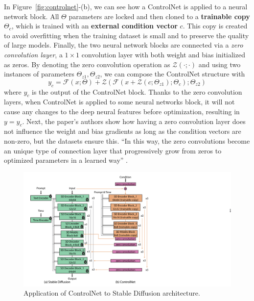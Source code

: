 \documentclass[preprint]{elsarticle}
\begin{document}
In Figure~\ref{fig:controlnet}-(b), we can see how a ControlNet is applied to a neural network block.
All $\Theta$ parameters are locked and then cloned to a \textbf{trainable copy} $\Theta_c$, 
which is trained with an \textbf{external condition vector} $c$. 
This copy is created to avoid overfitting when the training dataset is small 
and to preserve the quality of large models. 
Finally, the two neural network blocks are connected via a \emph{zero convolution layer}, 
a $1\times1$ convolution layer with both weight and bias initialized as zeros.
By denoting the zero convolution operation as $\mathcal{Z}(\cdot;\cdot)$
and using two instances of parameters ${\Theta_{z1},\Theta_{z2}}$,
we can compose the ControlNet structure with
\begin{equation}
	y_c = \mathcal{F}(x;\Theta) + \mathcal{Z}(\mathcal{F}(x+\mathcal{Z}(c;\Theta_{z1});\Theta_c);\Theta_{z2})
\end{equation}
where $y_c$ is the output of the ControlNet block.
Thanks to the zero convolution layers, when ControlNet is applied to some neural networks block, 
it will not cause any changes to the deep neural features before optimization, resulting in $y=y_c$.
Next, the paper's authors show how having a zero convolution layer does not influence the weight 
and bias gradients as long as the condition vectors are non-zero, but the datasets ensure this.
``In this way, the 
zero convolutions become an unique type of connection layer that progressively grow from zeros to
optimized parameters in a learned way'' \cite{zhang2023adding}.

\begin{figure}[t]
	\centering
    \includegraphics[scale=0.8]{img/svg/Controlnet2.png}
	\caption{Application of ControlNet to Stable Diffusion architecture.}\label{fig:controlnet-2}
\end{figure}
\end{document}
